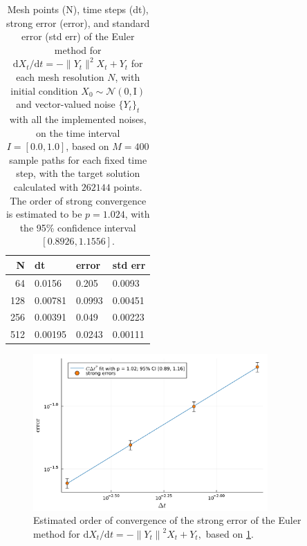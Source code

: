 \documentclass[reqno,12pt]{amsart}
\theoremstyle{plain} %
\theoremstyle{definition} %
\begin{document}
\begin{table}
    \begin{center}
        \begin{tabular}[htb]{|r|l|l|l|}
            \hline N & dt & error & std err \\
            \hline \hline
            64 & 0.0156 & 0.205 & 0.0093 \\
            128 & 0.00781 & 0.0993 & 0.00451 \\
            256 & 0.00391 & 0.049 & 0.00223 \\
            512 & 0.00195 & 0.0243 & 0.00111 \\
            \hline
        \end{tabular}
    \end{center}

    \bigskip

    \caption{Mesh points (N), time steps (dt), strong error (error), and standard error (std err) of the Euler method for $\mathrm{d}{X}_t/\mathrm{d}t = - \| {Y}_t\|^2 {X}_t + {Y}_t$ for each mesh resolution $N$, with initial condition ${X}_0 \sim \mathcal{N}({0}, \mathrm{I})$ and vector-valued noise $\{{Y}_t\}_t$ with all the implemented noises, on the time interval $I = [0.0, 1.0]$, based on $M = 400$ sample paths for each fixed time step, with the target solution calculated with $262144$ points. The order of strong convergence is estimated to be $p = 1.024$, with the 95\% confidence interval $[0.8926, 1.1556]$.}
    
        \label{supp:taballnoises}    
\end{table}

\begin{figure}[htb]
    \centerline{\includegraphics[width=0.8\textwidth]{img/order_allnoises.pdf}}
    \caption{Estimated order of convergence of the strong error of the Euler method for $\mathrm{d}{X}_t/\mathrm{d}t = - \left\|{Y}_t\right\|^2 {X}_t + {Y}_t,$ based on \cref{supp:taballnoises}.}
    \label{supp:figallnoises}
\end{figure}
\end{document}
